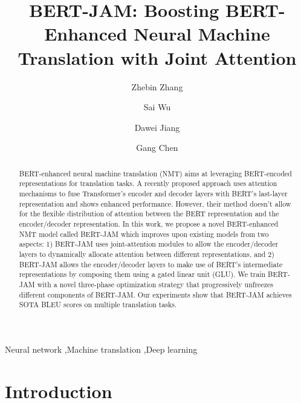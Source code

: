 \documentclass[review]{elsarticle}
\begin{document}
\hypersetup{allcolors = cyan}

\begin{frontmatter}

\title{BERT-JAM: Boosting BERT-Enhanced Neural Machine Translation with Joint Attention}


\author{Zhebin Zhang}

\author{Sai Wu}

\author{Dawei Jiang}

\author{Gang Chen}

\address{College of Computer Science and Technology, Zhejiang University, Hangzhou 310007, China}


\begin{abstract}
BERT-enhanced neural machine translation (NMT) aims at leveraging BERT-encoded representations for translation tasks. A recently proposed approach uses attention mechanisms to fuse Transformer's encoder and decoder layers with BERT's last-layer representation and shows enhanced performance. However, their method doesn't allow for the flexible distribution of attention between the BERT representation and the encoder/decoder representation. In this work, we propose a novel BERT-enhanced NMT model called BERT-JAM which improves upon existing models from two aspects: 1) BERT-JAM uses joint-attention modules to allow the encoder/decoder layers to dynamically allocate attention between different representations, and 2) BERT-JAM allows the encoder/decoder layers to make use of BERT's intermediate representations by composing them using a gated linear unit (GLU). We train BERT-JAM with a novel three-phase optimization strategy that progressively unfreezes different components of BERT-JAM. Our experiments show that BERT-JAM achieves SOTA BLEU scores on multiple translation tasks.
\end{abstract}

\begin{keyword}
    Neural network \sep Machine translation \sep Deep learning 
\end{keyword}

\end{frontmatter}


\section{Introduction}
\end{document}
